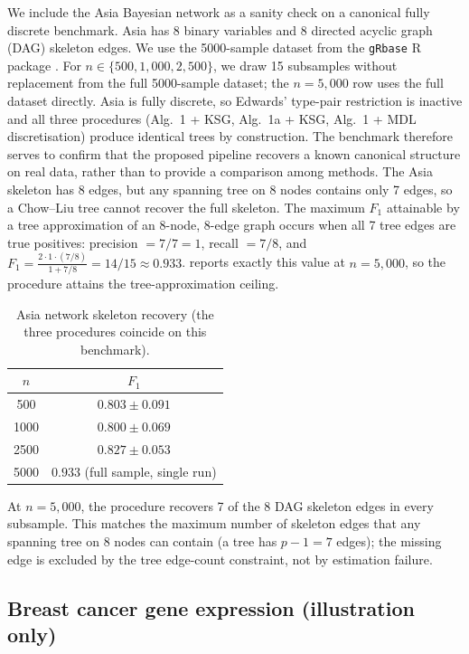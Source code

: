 We include the Asia Bayesian network \citep{lauritzen1988local} as a
sanity check on a canonical fully discrete benchmark. Asia has 8
binary variables and 8 directed acyclic graph (DAG) skeleton edges. We use the 5000-sample dataset from the
\texttt{gRbase} R package \citep{hojsgaard2012graphical}. For
$n \in \{500, 1{,}000, 2{,}500\}$, we draw 15 subsamples without
replacement from the full 5000-sample dataset; the $n = 5{,}000$
row uses the full dataset directly. Asia is
fully discrete, so Edwards' type-pair restriction is inactive
and all three procedures (Alg.~1 + KSG, Alg.~1a + KSG, Alg.~1 + MDL
discretisation) produce identical trees by construction. The
benchmark therefore serves to confirm that the proposed pipeline
recovers a known canonical structure on real data, rather than to
provide a comparison among methods.
The Asia skeleton has 8 edges, but any spanning tree on 8 nodes
contains only 7 edges, so a Chow--Liu tree cannot recover the full
skeleton. The maximum $F_1$ attainable by a tree approximation of
an 8-node, 8-edge graph occurs when all 7 tree edges are true
positives: precision $= 7/7 = 1$, recall $= 7/8$, and
$F_1 = \tfrac{2 \cdot 1 \cdot (7/8)}{1 + 7/8} = 14/15 \approx 0.933$.
 reports exactly this value at $n = 5{,}000$, so the
procedure attains the tree-approximation ceiling.

\begin{table}[ht]
\centering
\caption{Asia network skeleton recovery (the three procedures coincide
on this benchmark).}
\label{tab:asia}
\begin{tabular}{cc}
\toprule
$n$ & $F_1$ \\
\midrule
500   & $0.803 \pm 0.091$ \\
1000  & $0.800 \pm 0.069$ \\
2500  & $0.827 \pm 0.053$ \\
5000  & $0.933$ (full sample, single run) \\
\bottomrule
\end{tabular}
\end{table}

At $n = 5{,}000$, the procedure recovers 7 of the 8 DAG skeleton edges
in every subsample. This matches the maximum number of skeleton edges
that any spanning tree on 8 nodes can contain (a tree has $p - 1 = 7$
edges); the missing edge is excluded by the tree edge-count
constraint, not by estimation failure.

\subsection{Breast cancer gene expression (illustration only)}
\label{subsec:breastcancer}

